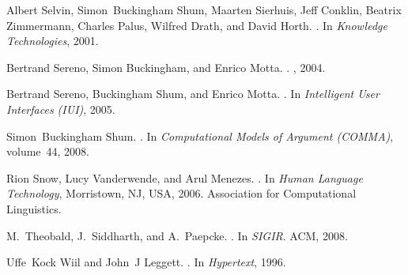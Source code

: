 \documentclass{www2010-accepted}
\begin{document}
\begin{thebibliography}{10}
Albert Selvin, Simon~Buckingham Shum, Maarten Sierhuis, Jeff Conklin, Beatrix
  Zimmermann, Charles Palus, Wilfred Drath, and David Horth.
.
\newblock In {\em Knowledge Technologies}, 2001.

Bertrand Sereno, Simon Buckingham, and Enrico Motta.
.
, 2004.

Bertrand Sereno, Buckingham Shum, and Enrico Motta.
.
\newblock In {\em Intelligent User Interfaces (IUI)}, 2005.

Simon~Buckingham Shum.
.
\newblock In {\em Computational Models of Argument (COMMA)}, volume~44, 2008.

Rion Snow, Lucy Vanderwende, and Arul Menezes.
.
\newblock In {\em Human Language Technology}, Morristown, NJ, USA, 2006.
  Association for Computational Linguistics.

M.~Theobald, J.~Siddharth, and A.~Paepcke.
.
\newblock In {\em SIGIR}. ACM, 2008.

Uffe~Kock Wiil and John~J Leggett.
.
\newblock In {\em Hypertext}, 1996.

\end{thebibliography}
\end{document}
